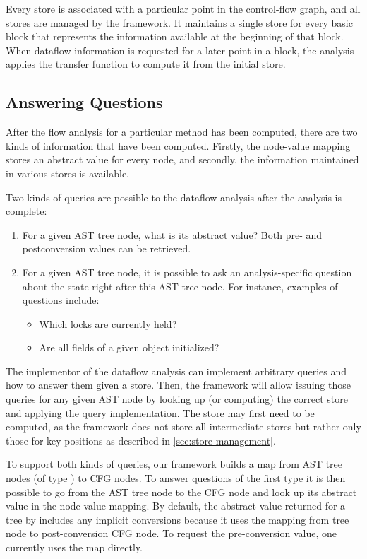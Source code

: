 Every store is associated with a particular point in the control-flow graph, and
all stores are managed by the framework. It maintains
a single store for every basic block that represents the information available at the
beginning of that block.  When dataflow information is requested for a later point in a block, the analysis applies the transfer function to compute it from the initial store.



\subsection{Answering Questions}
After the flow analysis for a particular method has been computed, there are two kinds of
information that have been computed.  Firstly, the node-value mapping stores an abstract
value for every node, and secondly, the information maintained in various stores is
available.

Two kinds of queries are possible to the dataflow analysis after the analysis is complete:
\begin{enumerate}
    \item For a given AST tree node, what is its abstract value?  Both pre- and postconversion
    values can be retrieved.
    \item For a given AST tree node, it is possible to ask an analysis-specific question
    about the state right after this AST tree node. For instance, examples of questions
    include:
    \begin{itemize}
        \item Which locks are currently held?
        \item Are all fields of a given object initialized?
    \end{itemize}
\end{enumerate}

The implementor
of the dataflow analysis can implement arbitrary queries and how to answer them
given a store. Then, the framework will allow issuing those queries for
any given AST node by looking up (or computing) the correct store and applying the query
implementation.
The store may first need to be computed, as the framework does not store all intermediate
stores but rather only those for key positions as described in \autoref{sec:store-management}.

To support both kinds of queries, our framework builds a map from AST tree nodes (of type
) to CFG nodes.  To answer questions of the first type it is
then possible to go from the AST tree node to the CFG node and look up its abstract value in
the node-value mapping.  By default, the abstract value returned for a tree by  includes any implicit conversions because it uses the mapping
from tree node to post-conversion CFG node.  To request the pre-conversion value, one currently uses the  map directly.


